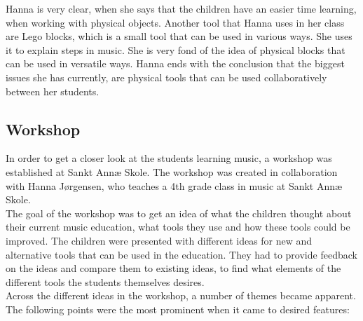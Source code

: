 Hanna is very clear, when she says that the children have an easier time learning, when working with physical objects. Another tool that Hanna uses in her class are Lego blocks, which is a small tool that can be used in various ways. She uses it to explain steps in music. She is very fond of the idea of physical blocks that can be used in versatile ways.
Hanna ends with the conclusion that the biggest issues she has currently, are physical tools that can be used collaboratively between her students.\\


\subsection{Workshop}
In order to get a closer look at the students learning music, a workshop was established at Sankt Annæ Skole. The workshop was created in collaboration with Hanna Jørgensen, who teaches a 4th grade class in music at Sankt Annæ Skole.\\

The goal of the workshop was to get an idea of what the children thought about their current music education, what tools they use and how these tools could be improved. The children were presented with different ideas for new and alternative tools that can be used in the education. They had to provide feedback on the ideas and compare them to existing ideas, to find what elements of the different tools the students themselves desires.\\

Across the different ideas in the workshop, a number of themes became apparent. The following points were the most prominent when it came to desired features:\\


